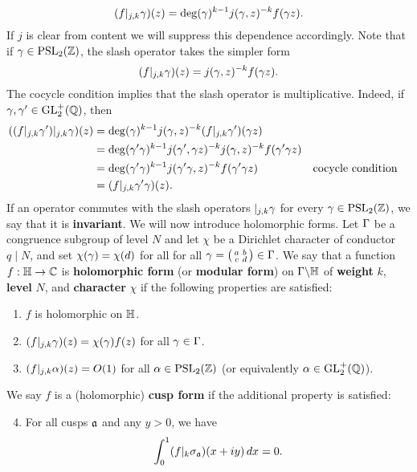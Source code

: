     \[
      (f|_{j,k}\gamma)(z) = \deg(\gamma)^{k-1}j(\gamma,z)^{-k}f(\gamma z).
    \]
    If $j$ is clear from content we will suppress this dependence accordingly. Note that if $\gamma \in \mathrm{PSL}_{2}(\mathbb{Z})$, the slash operator takes the simpler form
    \[
      (f|_{j,k}\gamma)(z) = j(\gamma,z)^{-k}f(\gamma z).
    \]
    The cocycle condition implies that the slash operator is multiplicative. Indeed, if $\gamma,\gamma' \in \mathrm{GL}_{2}^{+}(\mathbb{Q})$, then
    \begin{align*}
      ((f|_{j,k}\gamma')|_{j,k}\gamma)(z) &= \deg(\gamma)^{k-1}j(\gamma,z)^{-k}(f|_{j,k}\gamma')(\gamma z) \\
      &= \deg(\gamma'\gamma)^{k-1}j(\gamma',\gamma z)^{-k}j(\gamma,z)^{-k}f(\gamma'\gamma z) \\
      &= \deg(\gamma'\gamma)^{k-1}j(\gamma'\gamma,z)^{-k}f(\gamma'\gamma z) && \text{cocycle condition} \\
      &= (f|_{j,k}\gamma'\gamma)(z).
    \end{align*}
    If an operator commutes with the slash operators $|_{j,k}\gamma$ for every $\gamma \in \mathrm{PSL}_{2}(\mathbb{Z})$, we say that it is \textbf{invariant}. We will now introduce holomorphic forms. Let $\Gamma$ be a congruence subgroup of level $N$ and let $\chi$ be a Dirichlet character of conductor $q \mid N$, and set $\chi(\gamma) = \chi(d)$ for all for all $\gamma = \begin{psmallmatrix} a & b \\ c & d \end{psmallmatrix} \in \Gamma$. We say that a function $f:\mathbb{H} \to \mathbb{C}$ is \textbf{holomorphic form} (or \textbf{modular form}) on $\Gamma\backslash\mathbb{H}$ of \textbf{weight} $k$, \textbf{level} $N$, and \textbf{character} $\chi$ if the following properties are satisfied:
    \begin{enumerate}[label=(\roman*)]
      \item $f$ is holomorphic on $\mathbb{H}$.
      \item $(f|_{j,k}\gamma)(z) = \chi(\gamma)f(z)$ for all $\gamma \in \Gamma$.
      \item $(f|_{j,k}\alpha)(z) = O(1)$ for all $\alpha \in \mathrm{PSL}_{2}(\mathbb{Z})$ (or equivalently $\alpha \in \mathrm{GL}_{2}^{+}(\mathbb{Q})$).
    \end{enumerate}
    We say $f$ is a (holomorphic) \textbf{cusp form} if the additional property is satisfied:
    \begin{enumerate}[label=(\roman*)]
      \setcounter{enumi}{3}
      \item For all cusps $\mathfrak{a}$ and any $y > 0$, we have
      \[
        \int_{0}^{1}(f|_{k}\sigma_{\mathfrak{a}})(x+iy)\,dx = 0.
      \]
    \end{enumerate}
